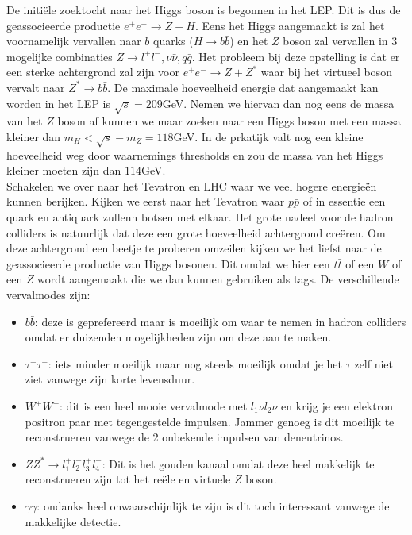 \documentclass[../main.tex]{subfiles}
\begin{document}
De initiële zoektocht naar het Higgs boson is begonnen in het LEP. Dit is dus de geassocieerde productie $e^{+} e^{-} \rightarrow Z+H$. Eens het Higgs aangemaakt is zal het voornamelijk vervallen naar $b$ quarks ($H \rightarrow b \bar{b}$) en het $Z$ boson zal vervallen in 3 mogelijke combinaties $Z \rightarrow l^{+} l^{-}, \nu \bar{\nu}, q \bar{q}$. Het probleem bij deze opstelling is dat er een sterke achtergrond zal zijn voor $e^{+} e^{-} \rightarrow Z+Z^{*}$ waar bij het virtueel boson vervalt naar $Z^{*} \rightarrow b \bar{b}$. De maximale hoeveelheid energie dat aangemaakt kan worden in het LEP is $\sqrt{s} = 209$GeV. Nemen we hiervan dan nog eens de massa van het $Z$ boson af kunnen we maar zoeken naar een Higgs boson met een massa kleiner dan $m_{H}<\sqrt{s}-m_{Z}=118$GeV. In de prkatijk valt nog een kleine hoeveelheid weg door waarnemings thresholds en zou de massa van het Higgs kleiner moeten zijn dan $114$GeV.\\
Schakelen we over naar het Tevatron en LHC waar we veel hogere energieën kunnen berijken. Kijken we eerst naar het Tevatron waar $p\bar{p}$ of in essentie een quark en antiquark zullenn botsen met elkaar. Het grote nadeel voor de hadron colliders is natuurlijk dat deze een grote hoeveelheid achtergrond creëren. Om deze achtergrond een beetje te proberen omzeilen kijken we het liefst naar de geassocieerde productie van Higgs bosonen. Dit omdat we hier een $t\bar{t}$ of een $W$ of een $Z$ wordt aangemaakt die we dan kunnen gebruiken als tags. De verschillende vervalmodes zijn:
\begin{itemize}
    \item $b\bar{b}$: deze is geprefereerd maar is moeilijk om waar te nemen in hadron colliders omdat er duizenden mogelijkheden zijn om deze aan te maken.
    \item $\tau^{+} \tau^{-}$: iets minder moeilijk maar nog steeds moeilijk omdat je het $\tau$ zelf niet ziet vanwege zijn korte levensduur.
    \item $W^+W^-$: dit is een heel mooie vervalmode met $l_{1} \nu l_{2} \nu$ en krijg je een elektron positron paar met tegengestelde impulsen. Jammer genoeg is dit moeilijk te reconstrueren vanwege de 2 onbekende impulsen van deneutrinos.
    \item $Z Z^{*} \rightarrow l_{1}^{+} l_{2}^{-} l_{3}^{+} l_{4}^{-}$: Dit is het gouden kanaal omdat deze heel makkelijk te reconstrueren zijn tot het reële en virtuele $Z$ boson.
    \item $\gamma\gamma$: ondanks heel onwaarschijnlijk te zijn is dit toch interessant vanwege de makkelijke detectie.
\end{itemize}
\end{document}
